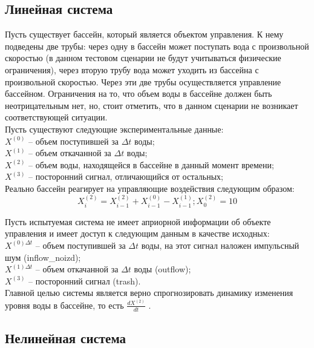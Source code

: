\documentclass[utf8,usehyperref,12pt]{G7-32}
\begin{document}
\subsection{Линейная система}
Пусть существует бассейн, который является объектом управления. К нему подведены две трубы: через одну в бассейн может поступать вода с произвольной скоростью (в данном тестовом сценарии не будут учитываться физические ограничения), через вторую трубу вода может уходить из бассейна с произвольной скоростью. Через эти две трубы осуществляется управление бассейном. Ограничения на то, что объем воды в бассейне должен быть неотрицательным нет, но, стоит отметить, что в данном сценарии не возникает соответствующей ситуации.\\
Пусть существуют следующие экспериментальные данные:\\
$ X^{(0)} $ – объем поступившей за $ \Delta t $ воды;\\
$ X^{(1)} $ – объем откачанной за $ \Delta t $ воды;\\
$ X^{(2)} $ – объем воды, находящейся в бассейне в данный момент времени;\\
$ X^{(3)} $ – посторонний сигнал, отличающийся от остальных;\\
Реально бассейн реагирует на управляющие воздействия следующим образом:\\
\begin{equation}
X^{(2)}_{i} = X^{(2)}_{i-1} + X^{(0)}_{i-1} - X^{(1)}_{i-1}; X^{(2)}_{0}=10
\end{equation}


Пусть испытуемая система не имеет априорной информации об объекте управления и имеет доступ к следующим данным в качестве исходных:\\
$ X^{(0) \Delta t} $ – объем поступившей за $ \Delta t $ воды, на этот сигнал наложен импульсный шум (inflow\_noizd);\\
$ X^{(1) \Delta t} $ – объем откачанной за $ \Delta t $ воды (outflow);\\
$ X^{(3)} $ – посторонний сигнал (trash).\\
Главной целью системы является верно спрогнозировать динамику изменения уровня воды в бассейне, то есть $ \frac{dX^{(2)}}{dt} $ .
\subsection{Нелинейная система}
\end{document}
